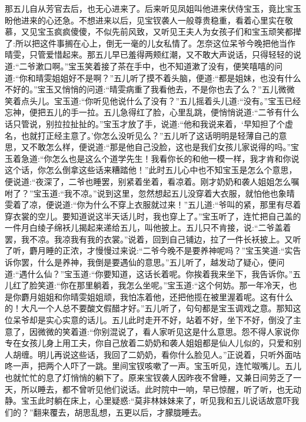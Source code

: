 \begin{parag}
    那五儿自从芳官去后，也无心进来了。后来听见凤姐叫他进来伏侍宝玉，竟比宝玉盼他进来的心还急。不想进来以后，见宝钗袭人一般尊贵稳重，看着心里实在敬慕，又见宝玉疯疯傻傻，不似先前风致，又听见王夫人为女孩子们和宝玉顽笑都撵了:所以把这件事搁在心上，倒无一毫的儿女私情了。怎奈这位呆爷今晚把他当作晴雯，只管爱惜起来。那五儿早已羞得两颊红潮，又不敢大声说话，只得轻轻的说道:“二爷漱口啊。”宝玉笑着接了茶在手中，也不知道漱了没有，便笑嘻嘻的问道:“你和晴雯姐姐好不是啊？”五儿听了摸不着头脑，便道:“都是姐妹，也没有什么不好的。”宝玉又悄悄的问道:“晴雯病重了我看他去，不是你也去了么？”五儿微微笑着点头儿。宝玉道:“你听见他说什么了没有？”五儿摇着头儿道:“没有。”宝玉已经忘神，便把五儿的手一拉。五儿急得红了脸，心里乱跳，便悄悄说道:“二爷有什么话只管说，别拉拉扯扯的。”宝玉才放了手，说道:“他和我说来着，‘早知担了个虚名，也就打正经主意了。’你怎么没听见么？”五儿听了这话明明是轻薄自己的意思，又不敢怎么样，便说道:“那是他自己没脸，这也是我们女孩儿家说得的吗。”宝玉着急道:“你怎么也是这么个道学先生！我看你长的和他一模一样，我才肯和你说这个话，你怎么倒拿这些话来糟踏他！”此时五儿心中也不知宝玉是怎么个意思，便说道:“夜深了，二爷也睡罢，别紧着坐着，看凉着。刚才奶奶和袭人姐姐怎么嘱咐了？”宝玉道:“我不凉。”说到这里，忽然想起五儿没穿着大衣服，就怕他也象晴雯着了凉，便说道:“你为什么不穿上衣服就过来！”五儿道:“爷叫的紧，那里有尽着穿衣裳的空儿。要知道说这半天话儿时，我也穿上了。”宝玉听了，连忙把自己盖的一件月白绫子绵袄儿揭起来递给五儿，叫他披上。五儿只不肯接，说:“二爷盖着罢，我不凉。我凉我有我的衣裳。”说着，回到自己铺边，拉了一件长袄披上。又听了听，麝月睡的正浓，才慢慢过来说:“二爷今晚不是要养神呢吗？”宝玉笑道:“实告诉你罢，什么是养神，我倒是要遇仙的意思。”五儿听了，越发动了疑心，便问道:“遇什么仙？”宝玉道:“你要知道，这话长着呢。你挨着我来坐下，我告诉你。”五儿红了脸笑道:“你在那里躺着，我怎么坐呢。”宝玉道:“这个何妨。那一年冷天，也是你麝月姐姐和你晴雯姐姐顽，我怕冻着他，还把他揽在被里渥着呢。这有什么的！大凡一个人总不要酸文假醋才好。”五儿听了，句句都是宝玉调戏之意。那知这位呆爷却是实心实意的话儿。五儿此时走开不好，站着不好，坐下不好，倒没了主意了，因微微的笑着道:“你别混说了，看人家听见这是什么意思。怨不得人家说你专在女孩儿身上用工夫，你自己放着二奶奶和袭人姐姐都是仙人儿似的，只爱和别人胡缠。明儿再说这些话，我回了二奶奶，看你什么脸见人。”正说着，只听外面咕咚一声，把两个人吓了一跳。里间宝钗咳嗽了一声。宝玉听见，连忙呶嘴儿。五儿也就忙忙的息了灯悄悄的躺下了。原来宝钗袭人因昨夜不曾睡，又兼日间劳乏了一天，所以睡去，都不曾听见他们说话。此时院中一响，早已惊醒，听了听，也无动静。宝玉此时躺在床上，心里疑惑:“莫非林妹妹来了，听见我和五儿说话故意吓我们的？”翻来覆去，胡思乱想，五更以后，才朦胧睡去。
\end{parag}


